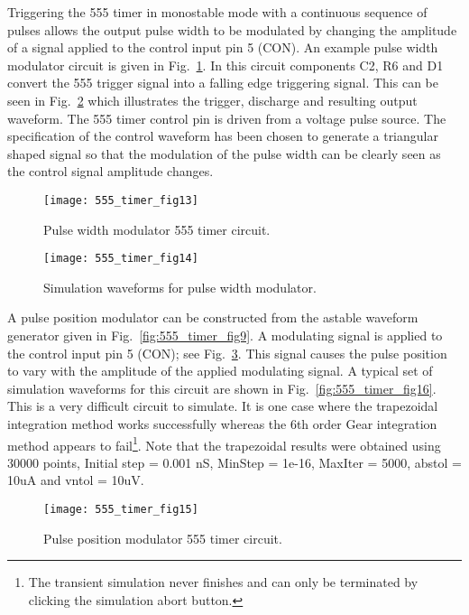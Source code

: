 Triggering the 555 timer in monostable mode with a continuous sequence of pulses allows the output pulse width to be modulated by changing the amplitude of a signal applied to the control input pin 5 (CON). An example pulse width modulator circuit is given in Fig.~\ref{fig:555_timer_fig13}. In this circuit components C2, R6 and D1 convert the 555 trigger signal into a falling edge triggering signal.  This can be seen in Fig.~\ref{fig:555_timer_fig14} which illustrates the trigger, discharge and resulting output waveform. The 555 timer control pin is driven from a voltage pulse source. The specification of the control waveform has been chosen to generate a triangular shaped signal so that the modulation of the pulse width can be clearly seen as the control signal amplitude changes.

\FloatBarrier
\begin{figure}[ht]
  \centering
  \texttt{[image: 555\_timer\_fig13]}
  \caption{Pulse width modulator 555 timer circuit.}
  \label{fig:555_timer_fig13} 
\end{figure} 
\FloatBarrier

\FloatBarrier
\begin{figure}[ht]
  \centering
  \texttt{[image: 555\_timer\_fig14]}
  \caption{Simulation waveforms for pulse width modulator.}
  \label{fig:555_timer_fig14} 
\end{figure} 
\FloatBarrier

A pulse position modulator can be constructed from the astable waveform generator given in Fig.~\ref{fig:555_timer_fig9}. A modulating signal is applied to the control input pin 5 (CON); see Fig.~\ref{fig:555_timer_fig15}.  This signal causes the pulse position to vary with the amplitude of the applied modulating signal. A typical set of simulation waveforms for this circuit are shown in Fig.~\ref{fig:555_timer_fig16}. This is a very difficult circuit to simulate.  It is one case where the trapezoidal integration method works successfully whereas the 6th order Gear integration method appears to fail\footnote{The transient simulation never finishes and can only be terminated by clicking the simulation abort button.}.  Note that the trapezoidal results were obtained using 30000 points, Initial step = 0.001 nS, MinStep = 1e-16, MaxIter = 5000, abstol = 10uA and vntol = 10uV. 
\FloatBarrier
\begin{figure}[ht]
  \centering
  \texttt{[image: 555\_timer\_fig15]}
  \caption{Pulse position modulator 555 timer circuit.}
  \label{fig:555_timer_fig15} 
\end{figure} 
\FloatBarrier

